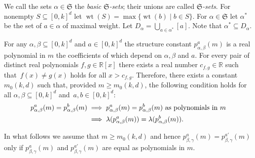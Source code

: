 \documentclass[ALCO]{cedram}
\newcommand{\fS}{\mathfrak S}
\newcommand{\wt}{\operatorname{wt}}
\renewcommand{\subset}{\subseteq}
\begin{document}
We call the sets $\alpha \in \fS$ the \emph{basic $\fS$-sets};
their unions are called \emph{$\fS$-sets}.
For nonempty $S \subseteq [0,k]^d$ let $\wt(S) = \max\{\wt(b) \mid b \in S\}$.
For $\alpha \in \fS$ let $\alpha^*$ be the set of $a \in \alpha$ of maximal weight.
Let $D_\alpha = \bigcup_{a \in \alpha^*} [a]$. Note that $\alpha^*\subseteq D_\alpha$.


{For any $\alpha,\beta\subseteq [0,k]^d$ and $a\in [0,k]^d$ the structure constant $p_{\alpha,\beta}^a(m)$ is a real polynomial in $m$ the coefficients of which depend on $\alpha,\beta$ and $a$. For every pair of distinct real polynomials $f,g\in \mathbb{R}[x]$ there exists a real number $c_{f,g}\in\mathbb{R}$ such that~$f(x)\neq g(x)$ holds for all $x > c_{f,g}$. Therefore, there exists a constant $m_0(k,d)$ such that, provided $m \geq m_0(k, d)$, the following condition holds for all $\alpha,\beta\subset [0,k]^d$ and~$a,b\in [0,k]^d$:
\begin{align}\label{poly}
    p_{\alpha,\beta}^a(m) = p_{\alpha,\beta}^b(m)
    &\implies p_{\alpha,\beta}^a(m) = p_{\alpha,\beta}^b(m)\text{ as polynomials in } m \\
    \notag &\implies \lambda(p_{\alpha,\beta}^a(m)) = \lambda(p_{\alpha,\beta}^b(m)).
\end{align}}

{In what follows we assume that $m \geq m_0(k, d)$ and hence $p^a_{\beta,\gamma}(m) = p^{a'}_{\beta,\gamma}(m)$ only if $p^a_{\beta,\gamma}(m)$ and $p^{a'}_{\beta,\gamma}(m)$ are equal as polynomials in $m$.}
\end{document}
